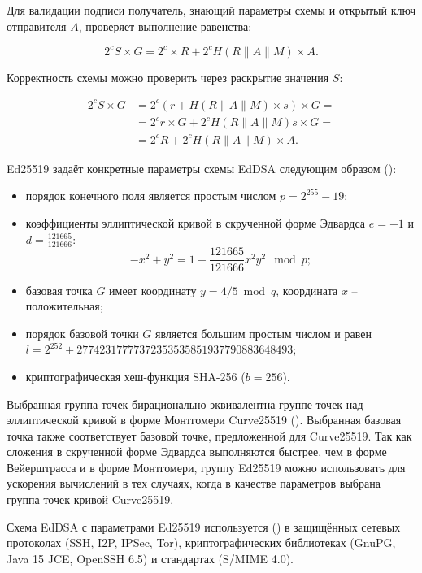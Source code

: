Для валидации подписи получатель, знающий параметры схемы и открытый ключ отправителя $A$, проверяет выполнение равенства:

\[
	2^c S \times G = 2^c \times R + 2^c H( R \| A \| M ) \times A.
\]

Корректность схемы можно проверить через раскрытие значения $S$:

\[ \begin{array}{ll}
2^c S \times G & = 2^c ( r + H( R \| A \| M ) \times s ) \times G = \\
               & = 2^c r \times G + 2^c H( R \| A \| M ) s \times G = \\
               & = 2^c R + 2^c H( R \| A \| M ) \times A.
\end{array} \]

Ed25519 задаёт конкретные параметры схемы EdDSA следующим образом (\cite{Bernstein:Duif:Lange:Schwabe:Yang:2011}):

\begin{itemize}
	\item порядок конечного поля является простым числом $p = 2^{255}-19$;
	\item коэффициенты эллиптической кривой в скрученной форме Эдвардса $e = -1$ и $d = \frac{121665}{121666}$:
\[
-x^2 + y^2 = 1 - \frac{121665}{121666}x^2y^2 \mod p;
\]
	\item базовая точка $G$ имеет координату $y = 4/5 \bmod q$, координата $x$ -- положительная;
	\item порядок базовой точки $G$ является большим простым числом и равен $l = 2^{252} + 27742317777372353535851937790883648493$;
	\item криптографическая хеш-функция SHA-256 ($b = 256$).
\end{itemize}

Выбранная группа точек бирационально эквивалентна группе точек над эллиптической кривой в форме Монтгомери Curve25519 (\cite{Bernstein:2006}). Выбранная базовая точка также соответствует базовой точке, предложенной для Curve25519. Так как сложения в скрученной форме Эдвардса выполняются быстрее, чем в форме Вейерштрасса и в форме Монтгомери, группу Ed25519 можно использовать для ускорения вычислений в тех случаях, когда в качестве параметров выбрана группа точек кривой Curve25519.

Схема EdDSA с параметрами Ed25519 используется (\cite{IANIX:Ed25519:2021}) в защищённых сетевых протоколах (SSH, I2P, IPSec, Tor), криптографических библиотеках (GnuPG, Java 15 JCE, OpenSSH 6.5) и стандартах (S/MIME 4.0).
